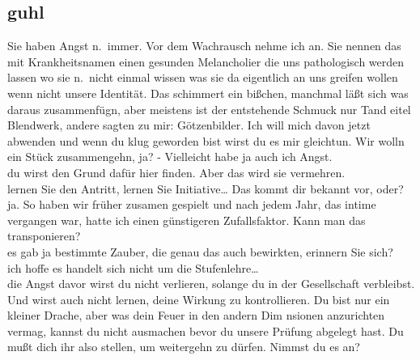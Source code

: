 \documentclass[
]{article}
\author{}
\date{\vspace{-2.5em}}
\begin{document}
\subsection{guhl}\label{guhl}

Sie haben Angst n.~immer. Vor dem Wachrausch nehme ich an. Sie nennen
das mit Krankheitsnamen einen gesunden Melancholier die uns pathologisch
werden lassen wo sie n.~nicht einmal wissen was sie da eigentlich an uns
greifen wollen wenn nicht unsere Identität. Das schimmert ein bißchen,
manchmal läßt sich was daraus zusammenfügn, aber meistens ist der
entstehende Schmuck nur Tand eitel Blendwerk, andere sagten zu mir:
Götzenbilder. Ich will mich davon jetzt abwenden und wenn du klug
geworden bist wirst du es mir gleichtun. Wir wolln ein Stück
zusammengehn, ja? - Vielleicht habe ja auch ich Angst.\\
du wirst den Grund dafür hier finden. Aber das wird sie vermehren.\\
lernen Sie den Antritt, lernen Sie Initiative\ldots{} Das kommt dir
bekannt vor, oder?\\
ja. So haben wir früher zusamen gespielt und nach jedem Jahr, das intime
vergangen war, hatte ich einen günstigeren Zufallsfaktor. Kann man das
transponieren?\\
es gab ja bestimmte Zauber, die genau das auch bewirkten, erinnern Sie
sich?\\
ich hoffe es handelt sich nicht um die Stufenlehre\ldots{}\\
die Angst davor wirst du nicht verlieren, solange du in der Gesellschaft
verbleibst. Und wirst auch nicht lernen, deine Wirkung zu kontrollieren.
Du bist nur ein kleiner Drache, aber was dein Feuer in den andern Dim
nsionen anzurichten vermag, kannst du nicht ausmachen bevor du unsere
Prüfung abgelegt hast. Du mußt dich ihr also stellen, um weitergehn zu
dürfen. Nimmst du es an?
\end{document}
